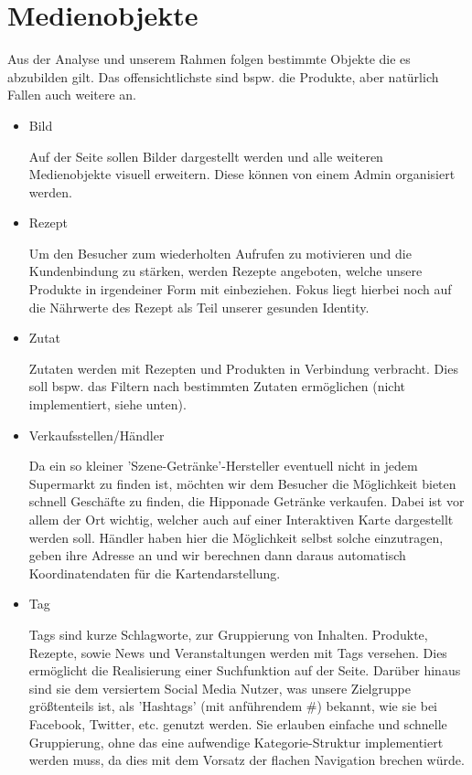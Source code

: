 \documentclass[12pt,a4paper,oneside,ngerman]{article}
\begin{document}
\section{Medienobjekte} %
Aus der Analyse und unserem Rahmen folgen bestimmte Objekte die es abzubilden gilt. Das offensichtlichste sind bspw. die Produkte, aber natürlich Fallen auch weitere an.
\begin{itemize}
\item Bild

Auf der Seite sollen Bilder dargestellt werden und alle weiteren Medienobjekte visuell erweitern. Diese können von einem Admin organisiert werden.

\item Rezept

Um den Besucher zum wiederholten Aufrufen zu motivieren und die Kundenbindung zu stärken, werden Rezepte angeboten, welche unsere Produkte in irgendeiner Form mit einbeziehen.
Fokus liegt hierbei noch auf die Nährwerte des Rezept als Teil unserer gesunden Identity.

\item Zutat

Zutaten werden mit Rezepten und Produkten in Verbindung verbracht. Dies soll bspw. das Filtern nach bestimmten Zutaten ermöglichen (nicht implementiert, siehe unten).

\item Verkaufsstellen/Händler

Da ein so kleiner 'Szene-Getränke'-Hersteller eventuell nicht in jedem Supermarkt zu finden ist, möchten wir dem Besucher die Möglichkeit bieten schnell Geschäfte zu finden, die Hipponade Getränke verkaufen. 
Dabei ist vor allem der Ort wichtig, welcher auch auf einer Interaktiven Karte dargestellt werden soll.
Händler haben hier die Möglichkeit selbst solche einzutragen, geben ihre Adresse an und wir berechnen dann daraus automatisch Koordinatendaten für die Kartendarstellung.

\item Tag

Tags sind kurze Schlagworte, zur Gruppierung von Inhalten.
Produkte, Rezepte, sowie News und Veranstaltungen werden mit Tags versehen. Dies ermöglicht die Realisierung einer Suchfunktion auf der Seite. 
Darüber hinaus sind sie dem versiertem Social Media Nutzer, was unsere Zielgruppe größtenteils ist, als 'Hashtags' (mit anführendem \#) bekannt, wie sie bei Facebook, Twitter, etc. genutzt werden. 
Sie erlauben einfache und schnelle Gruppierung, ohne das eine aufwendige Kategorie-Struktur implementiert werden muss, da dies mit dem Vorsatz der flachen Navigation brechen würde.


\end{itemize}
\end{document}
